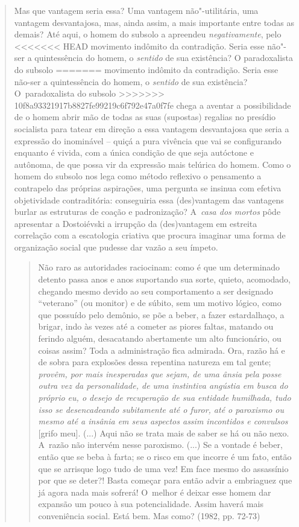 {\begin{quote}
Mas que vantagem seria essa? Uma vantagem não"-utilitária, uma vantagem
desvantajosa, mas, ainda assim, a mais importante entre todas as demais?
Até aqui, o homem do subsolo a apreendeu \emph{negativamente}, pelo
<<<<<<< HEAD
movimento indômito da contradição. Seria esse não"-ser a quintessência do
homem, o \emph{sentido} de sua existência? O paradoxalista do subsolo
=======
movimento indômito da contradição. Seria esse não-ser a quintessência do
homem, o \emph{sentido} de sua existência? O~paradoxalista do subsolo
>>>>>>> 10f8a93321917b8827fe99219c6f792e47a0f7fe
chega a aventar a possibilidade de o homem abrir mão de todas as suas
(supostas) regalias no presídio socialista para tatear em direção a essa
vantagem desvantajosa que seria a expressão do inominável -- quiçá a
pura vivência que vai se configurando enquanto é vivida, com a única
condição de que seja autóctone e autônoma, de que possa vir da expressão
mais telúrica do homem. Como o homem do subsolo nos lega como método
reflexivo o pensamento a contrapelo das próprias aspirações, uma
pergunta se insinua com efetiva objetividade contraditória: conseguiria
essa (des)vantagem das vantagens burlar as estruturas de coação e
padronização? A~\emph{casa dos mortos} pôde apresentar a Dostoiévski a
irrupção da (des)vantagem em estreita correlação com a escatologia
criativa que procura imaginar uma forma de organização social que
pudesse dar vazão a seu ímpeto.

\begin{quote}
Não raro as autoridades raciocinam: como é que um determinado detento
passa anos e anos suportando sua sorte, quieto, acomodado, chegando
mesmo devido ao seu comportamento a ser designado ``veterano'' (ou
monitor) e de súbito, sem um motivo lógico, como que possuído pelo
demônio, se põe a beber, a fazer estardalhaço, a brigar, indo às vezes
até a cometer as piores faltas, matando ou ferindo alguém, desacatando
abertamente um alto funcionário, ou coisas assim? Toda a administração
fica admirada. Ora, razão há e de sobra para explosões dessa repentina
natureza em tal gente; \emph{provêm, por mais inesperadas que sejam, de
uma ânsia pela posse outra vez da personalidade, de uma instintiva
angústia em busca do próprio eu, o desejo de recuperação de sua entidade
humilhada, tudo isso se desencadeando subitamente até o furor, até o
paroxismo ou mesmo até a insânia em seus aspectos assim incontidos e
convulsos} {[}grifo meu{]}. (...) Aqui não se trata mais de saber se há
ou não nexo. A~razão não intervém nesse paroxismo. (...) Se a vontade é
beber, então que se beba à farta; se o risco em que incorre é um fato,
então que se arrisque logo tudo de uma vez! Em face mesmo do assassínio
por que se deter?! Basta começar para então advir a embriaguez que já
agora nada mais sofrerá! O~melhor é deixar esse homem dar expansão um
pouco à sua potencialidade. Assim haverá mais conveniência social. Está
bem. Mas como? (1982, pp. 72-73)
\end{quote}


\end{quote}}
